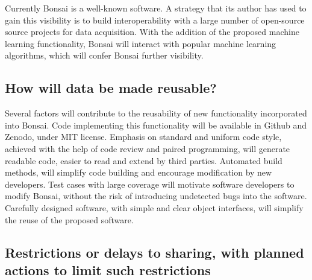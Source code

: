 \documentclass[a4paper,11pt]{article}
\begin{document}


Currently Bonsai is a well-known software. A strategy that its author has
used to gain this visibility is to build interoperability with a large number
of open-source source projects for data acquisition. With the addition of the
proposed machine learning functionality, Bonsai will interact with popular
machine learning algorithms, which will confer Bonsai further visibility.


\subsection{How will data be made reusable?}


Several factors will contribute to the reusability of new functionality
incorporated into Bonsai. Code implementing this functionality will be
available in Github and Zenodo, under MIT license. Emphasis on standard and
uniform code style, achieved with the help of code review and paired
programming, will generate readable code, easier to read and extend by third
parties. Automated build methods, will simplify code building and encourage
modification by new developers. Test cases with large coverage will motivate
software developers to modify Bonsai, without the risk of introducing
undetected bugs into the software. Carefully designed software, with simple and
clear object interfaces, will simplify the reuse of the proposed software.

\subsection{Restrictions or delays to sharing, with planned actions to limit such restrictions} 
\end{document}
